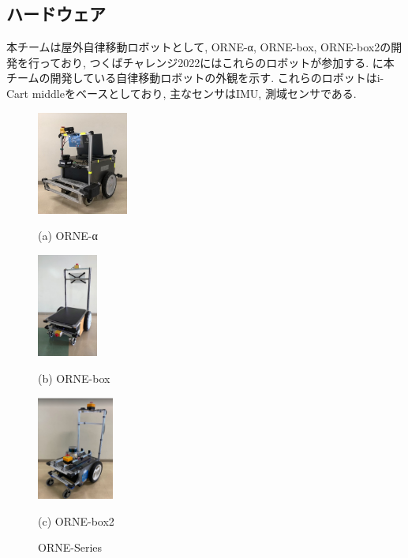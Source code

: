 \documentclass[uplatex, twocolumn, 9pt]{jsproceedings}
\begin{document}
\subsection{ハードウェア}
本チームは屋外自律移動ロボットとして, ORNE-α, ORNE-box, ORNE-box2の開発を行っており, つくばチャレンジ2022にはこれらのロボットが参加する. に本チームの開発している自律移動ロボットの外観を示す. これらのロボットはi-Cart middleをベースとしており, 主なセンサはIMU, 測域センサである. 

\begin{figure}[h]
  \centering
  \begin{minipage}[b]{0.3\linewidth}
    \centering
    \includegraphics[width=30mm]{fig/alpha.pdf}
    \caption*{(a) ORNE-α}
  \end{minipage} 
  \hspace{0.03\columnwidth}
  \begin{minipage}[b]{0.3\linewidth}
    \centering
    \includegraphics[height=34mm]{fig/box.pdf}
    \caption*{(b) ORNE-box}
  \end{minipage}
  \begin{minipage}[b]{0.3\linewidth}
    \centering
    \includegraphics[height=34mm]{fig/box2.pdf}
    \caption*{(c) ORNE-box2}
  \end{minipage}
  \caption{ORNE-Series}
  \label{fig:matching-concept}%
\end{figure}
\end{document}
